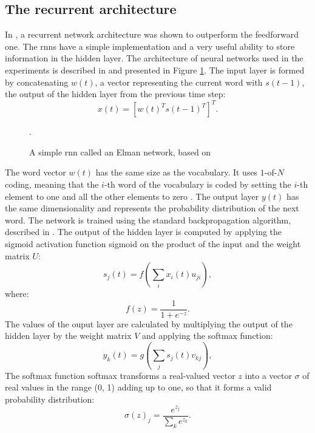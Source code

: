 	\subsection{The recurrent architecture}
	In \cite{mikolov2011extensions}, a recurrent network architecture was shown to outperform the feedforward one. The \glspl{rnn} have a simple implementation and a very useful ability to store information in the hidden layer. The architecture of neural networks used in the experiments is described in \cite{mikolov2010recurrent} and presented in Figure \ref{figure:recurrent}. The input layer is formed by concatenating $w(t)$, a vector representing the current word with $s(t-1)$, the output of the hidden layer from the previous time step:
	\begin{equation}
		x(t)=[w(t)^{T}s(t-1)^{T}]^{T}.
		\label{equation:word_vector}
	\end{equation}

	\begin{figure}[htbp]
		\centering
		
		\caption[A simple \gls{rnn}]{A simple \gls{rnn} called an Elman network, based on \cite{mikolov2011extensions}}.
		\label{figure:recurrent}
	\end{figure}
	The word vector $w(t)$ has the same size as the vocabulary. It uses \mbox{$1$-of-$N$} coding, meaning that the $i$-th word of the vocabulary is coded by setting the $i$-th element to one and all the other elements to zero \cite{schwenk2005training}. The output layer $y(t)$ has the same dimensionality and represents the probability distribution of the next word. The network is trained using the standard backpropagation algorithm, described in \cite{rumelhart1988learning}. The output of the hidden layer is computed by applying the sigmoid activation function \gls{sigmoid} on the product of the input and the weight matrix $U$:
	\begin{equation}
		s_{j}(t)=f(\sum_{i}x_{i}(t)u_{ji}),
		\label{equation:hidden}
	\end{equation}
where:
\begin{equation}
	f(z)=\frac{1}{1+e^{-z}}.
	\label{equation:sigmoid}
\end{equation}
The values of the ouput layer are calculated by multiplying the output of the hidden layer by the weight matrix $V$ and applying the softmax function:
\begin{equation}
	y_{k}(t)=g(\sum_{j}s_{j}(t)v_{kj}),
	\label{equation:output}
\end{equation}
The softmax function \gls{softmax} transforms a real-valued vector $z$ into a vector $\sigma$ of real values in the range (0, 1) adding up to one, so that it forms a valid probability distribution:
\begin{equation}
	\sigma(z)_{j}=\frac{e^{z_{j}}}{\sum_{k}e^{z_{k}}}.
	\label{equation:softmax}
\end{equation}

